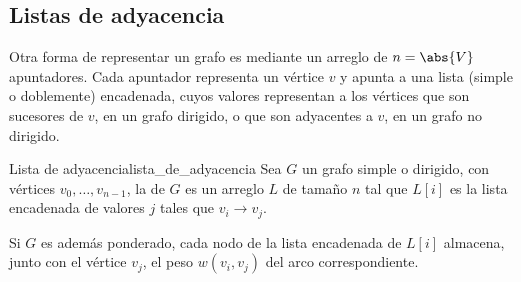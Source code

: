 
\subsection{Listas de adyacencia}
\label{sec:listas_de_adyacencia}

Otra forma de representar un grafo es mediante un arreglo de \(n = \abs{V}\) apuntadores. Cada apuntador representa un vértice \(v\) y apunta a una lista (simple o doblemente) encadenada, cuyos valores representan a los vértices que son sucesores de \(v\), en un grafo dirigido, o que son adyacentes a \(v\), en un grafo no dirigido.

\begin{definicion}{Lista de adyacencia}{lista_de_adyacencia}
  Sea \(G\) un grafo simple o dirigido, con vértices \(v_0, \ldots, v_{n-1}\), la  de \(G\) es un arreglo \(L\) de tamaño \(n\) tal que \(L[i]\) es la lista encadenada de valores \(j\) tales que \(v_i \longrightarrow v_j\).
\end{definicion}

Si \(G\) es además ponderado, cada nodo de la lista encadenada de \(L[i]\) almacena, junto con el vértice \(v_j\), el peso \(w(v_i, v_j)\) del arco correspondiente.

